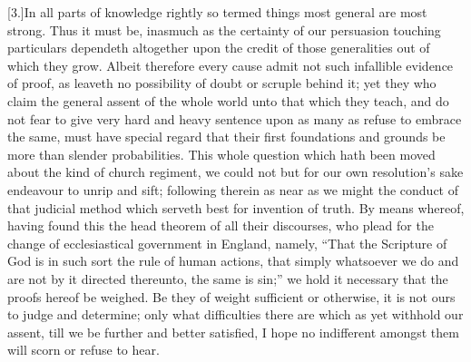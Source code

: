 [3.]In all parts of knowledge rightly so termed things most general are most strong. Thus it must be, inasmuch as the certainty of our persuasion touching particulars dependeth altogether upon the credit of those generalities out of which they grow. Albeit therefore every cause admit not such infallible evidence of proof, as leaveth no possibility of doubt or scruple behind it; yet they who claim the general assent  of the whole world unto that which they teach, and do not fear to give very hard and heavy sentence upon as many as refuse to embrace the same, must have special regard that their first foundations and grounds be more than slender probabilities. This whole question which hath been moved about the kind of church regiment, we could not but for our own resolution’s sake endeavour to unrip and sift; following therein as near as we might the conduct of that judicial method which serveth best for invention of truth. By means whereof, having found this the head theorem of all their discourses, who plead for the change of ecclesiastical government in England, namely, “That the Scripture of God is in such sort the rule of human actions, that simply whatsoever we do and are not by it directed thereunto, the same is sin;” we hold it necessary that the proofs hereof be weighed. Be they of weight sufficient or otherwise, it is not ours to judge and determine; only what difficulties there are which as yet withhold our assent, till we be further and better satisfied, I hope no indifferent amongst them will scorn or refuse to hear.

